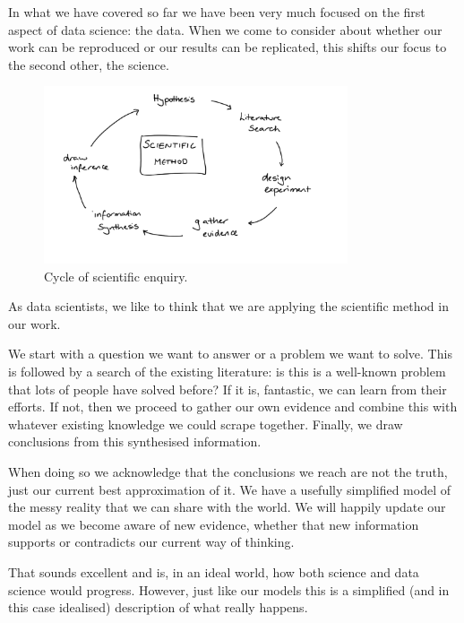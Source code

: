 \documentclass[
  letterpaper,
  DIV=11,
  numbers=noendperiod]{scrreprt}
\begin{document}
In what we have covered so far we have been very much focused on the
first aspect of data science: the data. When we come to consider about
whether our work can be reproduced or our results can be replicated,
this shifts our focus to the second other, the science.

\begin{figure}[H]

{\centering \includegraphics[width=0.8\textwidth,height=\textheight]{images/401-production-reproducibility/scientific-method.png}

}

\caption{Cycle of scientific enquiry.}

\end{figure}%

As data scientists, we like to think that we are applying the scientific
method in our work.

We start with a question we want to answer or a problem we want to
solve. This is followed by a search of the existing literature: is this
is a well-known problem that lots of people have solved before? If it
is, fantastic, we can learn from their efforts. If not, then we proceed
to gather our own evidence and combine this with whatever existing
knowledge we could scrape together. Finally, we draw conclusions from
this synthesised information.

When doing so we acknowledge that the conclusions we reach are not the
truth, just our current best approximation of it. We have a usefully
simplified model of the messy reality that we can share with the world.
We will happily update our model as we become aware of new evidence,
whether that new information supports or contradicts our current way of
thinking.

That sounds excellent and is, in an ideal world, how both science and
data science would progress. However, just like our models this is a
simplified (and in this case idealised) description of what really
happens.
\end{document}
